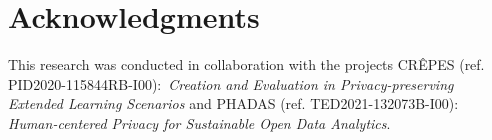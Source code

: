 \newpage

\section*{Acknowledgments}

This research was conducted in collaboration with the projects
CR\^EPES (ref. PID2020-115844RB-I00): \textit{Creation and Evaluation in Privacy-preserving Extended Learning Scenarios}
and PHADAS (ref. TED2021-132073B-I00): \textit{Human-centered Privacy for Sustainable Open Data Analytics}.
